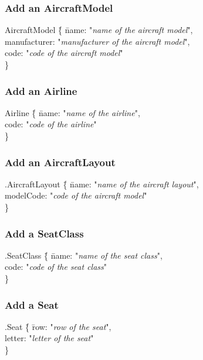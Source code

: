 \documentclass[a4paper,11pt]{article}
\begin{document}
\subsubsection*{Add an AircraftModel}
\begin{tabbing}
AircraftModel \= \{ \= name: "\textit{name of the aircraft model}", \\
	\> \> manufacturer: "\textit{manufacturer of the aircraft model}", \\
	\> \> code: "\textit{code of the aircraft model}" \\
\> \} \\
\end{tabbing}

\subsubsection*{Add an Airline}
\begin{tabbing}
Airline \= \{ \= name: "\textit{name of the airline}", \\
	\> \> code: "\textit{code of the airline}" \\
\> \} \\
\end{tabbing}

\subsubsection*{Add an AircraftLayout}
\begin{tabbing}
.AircraftLayout \= \{ \= name: "\textit{name of the aircraft layout}", \\
	\> \> modelCode: "\textit{code of the aircraft model}" \\
\> \} \\
\end{tabbing}

\subsubsection*{Add a SeatClass}
\begin{tabbing}
.SeatClass \= \{ \= name: "\textit{name of the seat class}", \\
	\> \> code: "\textit{code of the seat class}" \\
\> \} \\
\end{tabbing}

\subsubsection*{Add a Seat}
\begin{tabbing}
.Seat \= \{ \= row: "\textit{row of the seat}", \\
	\> \> letter: "\textit{letter of the seat}" \\
\> \} \\
\end{tabbing}
\end{document}
